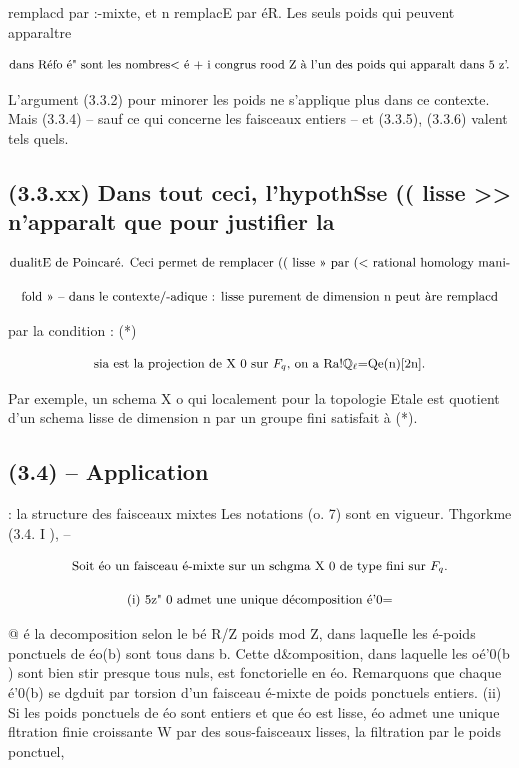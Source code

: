 \documentclass[11pt]{article}
\theoremstyle{remark}
\begin{document}
remplacd par :-mixte, et n remplacE par éR. Les seuls poids qui peuvent apparaltre

\[\text{\small dans Réfo é" sont les nombres< é + i congrus rood Z à l'un des poids qui apparalt dans 5 z'.}\]

L'argument (3.3.2) pour minorer les poids ne s'applique plus dans ce contexte. Mais (3.3.4) -- sauf ce qui concerne les faisceaux entiers -- et (3.3.5), (3.3.6) valent tels quels.

\subsection*{(3.3.xx) Dans tout ceci, l'hypothSse (( lisse >> n'apparalt que pour justifier la}

\[\text{\small dualitE de Poincaré. Ceci permet de remplacer (( lisse >> par (< rational homology mani-}\]

\[\text{\small fold >> -- dans le contexte/-adique : lisse purement de dimension n peut àre remplacd}\]

par la condition : (*)

\[\text{\small sia est la projection de X 0 sur \(F_q\), on a Ra!\(\mathbb{Q}_{\ell}\)=Qe(n)[2n].}\]

Par exemple, un schema X o qui localement pour la topologie Etale est quotient d'un schema lisse de dimension n par un groupe fini satisfait à (*).

\subsection*{(3.4) -- Application}

: la structure des faisceaux mixtes Les notations (o. 7) sont en vigueur. Thgorkme (3.4. I ), --

\[\text{\small Soit éo un faisceau é-mixte sur un schgma X 0 de type fini sur \(F_q\).}\]

\[\text{\small (i) 5z" 0 admet une unique décomposition é'0=}\]

@ é la decomposition selon le bé R/Z poids mod Z, dans laqueIle les é-poids ponctuels de éo(b) sont tous dans b. Cette d\&omposition, dans laquelle les oé'0(b ) sont bien stir presque tous nuls, est fonctorielle en éo. Remarquons que chaque é'0(b) se dgduit par torsion d'un faisceau é-mixte de poids ponctuels entiers. (ii) Si les poids ponctuels de éo sont entiers et que éo est lisse, éo admet une unique fltration finie croissante W par des sous-faisceaux lisses, la filtration par le poids ponctuel,
\end{document}
